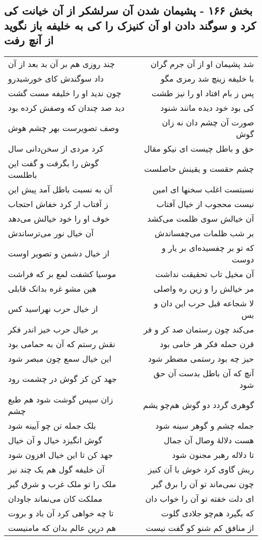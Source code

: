 \begin{center}
\section*{بخش ۱۶۶ - پشیمان شدن آن سرلشکر از آن خیانت کی کرد و سوگند دادن او آن کنیزک را کی به خلیفه باز نگوید از آنچ رفت}
\label{sec:sh166}
\begin{longtable}{l p{0.5cm} r}
چند روزی هم بر آن بد بعد از آن
&&
شد پشیمان او از آن جرم گران
\\
داد سوگندش کای خورشیدرو
&&
با خلیفه زینچ شد رمزی مگو
\\
چون ندید او را خلیفه مست گشت
&&
پس ز بام افتاد او را نیز طشت
\\
دید صد چندان که وصفش کرده بود
&&
کی بود خود دیده مانند شنود
\\
وصف تصویرست بهر چشم هوش
&&
صورت آن چشم دان نه زان گوش
\\
کرد مردی از سخن‌دانی سال
&&
حق و باطل چیست ای نیکو مقال
\\
گوش را بگرفت و گفت این باطلست
&&
چشم حقست و یقینش حاصلست
\\
آن به نسبت باطل آمد پیش این
&&
نسبتست اغلب سخنها ای امین
\\
ز آفتاب ار کرد خفاش احتجاب
&&
نیست محجوب از خیال آفتاب
\\
خوف او را خود خیالش می‌دهد
&&
آن خیالش سوی ظلمت می‌کشد
\\
آن خیال نور می‌ترساندش
&&
بر شب ظلمات می‌چفساندش
\\
از خیال دشمن و تصویر اوست
&&
که تو بر چفسیده‌ای بر یار و دوست
\\
موسیا کشفت لمع بر که فراشت
&&
آن مخیل تاب تحقیقت نداشت
\\
هین مشو غره بدانک قابلی
&&
مر خیالش را و زین ره واصلی
\\
از خیال حرب نهراسید کس
&&
لا شجاعه قبل حرب این دان و بس
\\
بر خیال حرب خیز اندر فکر
&&
می‌کند چون رستمان صد کر و فر
\\
نقش رستم که آن به حمامی بود
&&
قرن حمله فکر هر خامی بود
\\
این خیال سمع چون مبصر شود
&&
حیز چه بود رستمی مضطر شود
\\
جهد کن کز گوش در چشمت رود
&&
آنچ که آن باطل بدست آن حق شود
\\
زان سپس گوشت شود هم طبع چشم
&&
گوهری گردد دو گوش هم‌چو یشم
\\
بلک جمله تن چو آیینه شود
&&
جمله چشم و گوهر سینه شود
\\
گوش انگیزد خیال و آن خیال
&&
هست دلالهٔ وصال آن جمال
\\
جهد کن تا این خیال افزون شود
&&
تا دلاله رهبر مجنون شود
\\
آن خلیفه گول هم یک چند نیز
&&
ریش گاوی کرد خوش با آن کنیز
\\
ملک را تو ملک غرب و شرق گیر
&&
چون نمی‌ماند تو آن را برق گیر
\\
مملکت کان می‌نماند جاودان
&&
ای دلت خفته تو آن را خواب دان
\\
تا چه خواهی کرد آن باد و بروت
&&
که بگیرد هم‌چو جلادی گلوت
\\
هم درین عالم بدان که مامنیست
&&
از منافق کم شنو کو گفت نیست
\\
\end{longtable}
\end{center}

